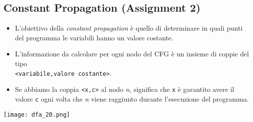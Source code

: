 \subsection{Constant Propagation (Assignment 2)}

\begin{itemize}
  \item L'obiettivo della \textit{constant propagation} \`e quello di determinare in quali punti del programma le variabili hanno un valore costante.
\end{itemize}
\noindent \begin{minipage}[c]{.6\textwidth}
\begin{itemize}
  \item L'informazione da calcolare per ogni nodo del CFG \`e un insieme di coppie del tipo\\\lstinline|<variabile,valore costante>|.
  \item Se abbiamo la coppia \lstinline|<x,c>| al nodo \textit{n}, significa che \lstinline|x| \`e garantito avere il valore \lstinline|c| ogni volta che \textit{n} viene raggiunto durante l'esecuzione del programma.
\end{itemize}
\end{minipage}
\hfill
\begin{minipage}[c]{.35\textwidth}
\texttt{[image: dfa\_20.png]}
\end{minipage}
